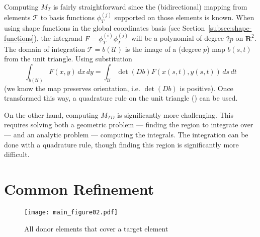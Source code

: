 \documentclass[letterpaper,10pt]{article}
\theoremstyle{definition}
\newcommand{\reals}{\mathbf{R}}
\newcommand{\utri}{\mathcal{U}}
\begin{document}
Computing \(M_T\) is fairly straightforward since the (bidirectional) mapping
from elements \(\mathcal{T}\) to basis functions \(\phi_T^{(j)}\) supported
on those elements is known. When using shape functions in the
global coordinates basis (see Section~\ref{subsec:shape-functions}), the
integrand \(F = \phi_T^{(i)} \phi_T^{(j)}\) will be a polynomial of degree
\(2p\) on \(\reals^2\). The domain of integration \(\mathcal{T}
= b\left(\utri\right)\) is the image of a (degree \(p\)) map \(b(s, t)\)
from the unit triangle. Using substitution
\begin{equation}\label{eq:mass-mat-subst}
\int_{b\left(\utri\right)} F(x, y) \, dx \, dy =
  \int_{\utri} \det(Db) F\left(x(s, t), y(s, t)\right) \, ds \, dt
\end{equation}
(we know the map preserves orientation, i.e. \(\det(Db)\) is positive).
Once transformed this way, a quadrature rule on the unit
triangle (\cite{Dunavant1985}) can be used.

On the other hand, computing \(M_{TD}\) is significantly more
challenging. This requires solving both a geometric problem ---
finding the region to integrate over --- and an analytic
problem --- computing the integrals. The integration can be done with
a quadrature rule, though finding this region is significantly
more difficult.

\section{Common Refinement}

\begin{figure}
  \texttt{[image: main\_figure02.pdf]}
  \centering
  \captionsetup{width=.75\linewidth}
  \caption{All donor elements that cover a target element}
  \label{fig:target-elt-all-matching}
\end{figure}
\end{document}
